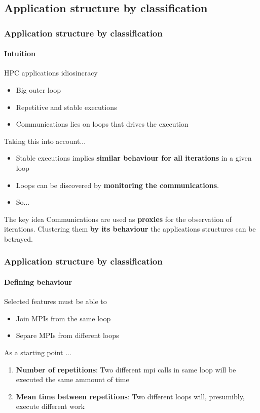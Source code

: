 \documentclass{beamer}
\begin{document}
\subsection{Application structure by classification}
\begin{frame}
\frametitle{Application structure by classification}
\framesubtitle{Intuition}
HPC applications idiosincracy\\
\begin{itemize}
	\item Big outer loop
	\item Repetitive and stable executions
	\item Communications lies on loops that drives the execution
\end{itemize}
Taking this into account...\\
\begin{itemize}
	\item Stable executions implies \textbf{similar behaviour for all iterations} in a given loop
	\item Loops can be discovered by \textbf{monitoring the communications}.
	\item So...
\end{itemize}
\vfill
\pause
\begin{block}{The key idea}
	Communications are used as \textbf{proxies} for the observation of iterations. Clustering them \textbf{by its behaviour} the applications structures can be betrayed.
\end{block}
\end{frame}

\begin{frame}
\frametitle{Application structure by classification}
\framesubtitle{Defining behaviour}
Selected features must be able to
\begin{itemize}
	\item Join MPIs from the same loop
	\item Separe MPIs from different loops
\end{itemize}
\vfill
\pause
As a starting point ...
\begin{enumerate}
	\item \textbf{Number of repetitions}: Two different mpi calls in same loop will be executed the same ammount of time
	\item \textbf{Mean time between repetitions}: Two different loops will, presumibly, execute different work
\end{enumerate}
\end{frame}
\end{document}
